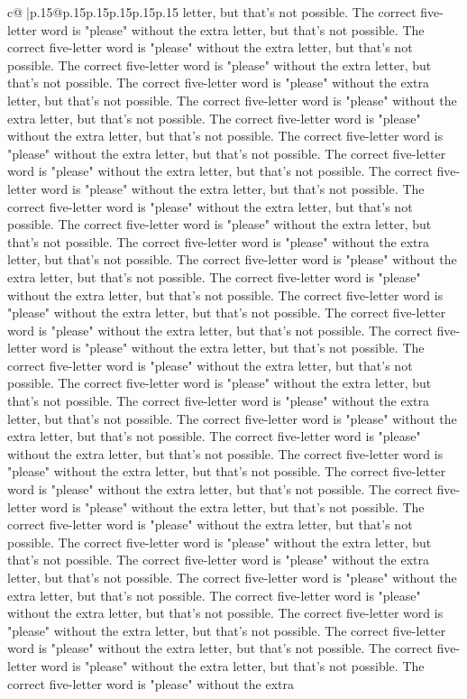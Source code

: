 \documentclass{article}
\begin{document}
{\begin{supertabular}{c@{$\;$}|p{.15\linewidth}@{}p{.15\linewidth}p{.15\linewidth}p{.15\linewidth}p{.15\linewidth}p{.15\linewidth}}
{{{letter, but that's not possible. The correct five{-}letter word is "please" without the extra letter, but that's not possible. The correct five{-}letter word is "please" without the extra letter, but that's not possible. The correct five{-}letter word is "please" without the extra letter, but that's not possible. The correct five{-}letter word is "please" without the extra letter, but that's not possible. The correct five{-}letter word is "please" without the extra letter, but that's not possible. The correct five{-}letter word is "please" without the extra letter, but that's not possible. The correct five{-}letter word is "please" without the extra letter, but that's not possible. The correct five{-}letter word is "please" without the extra letter, but that's not possible. The correct five{-}letter word is "please" without the extra letter, but that's not possible. The correct five{-}letter word is "please" without the extra letter, but that's not possible. The correct five{-}letter word is "please" without the extra letter, but that's not possible. The correct five{-}letter word is "please" without the extra letter, but that's not possible. The correct five{-}letter word is "please" without the extra letter, but that's not possible. The correct five{-}letter word is "please" without the extra letter, but that's not possible. The correct five{-}letter word is "please" without the extra letter, but that's not possible. The correct five{-}letter word is "please" without the extra letter, but that's not possible. The correct five{-}letter word is "please" without the extra letter, but that's not possible. The correct five{-}letter word is "please" without the extra letter, but that's not possible. The correct five{-}letter word is "please" without the extra letter, but that's not possible. The correct five{-}letter word is "please" without the extra letter, but that's not possible. The correct five{-}letter word is "please" without the extra letter, but that's not possible. The correct five{-}letter word is "please" without the extra letter, but that's not possible. The correct five{-}letter word is "please" without the extra letter, but that's not possible. The correct five{-}letter word is "please" without the extra letter, but that's not possible. The correct five{-}letter word is "please" without the extra letter, but that's not possible. The correct five{-}letter word is "please" without the extra letter, but that's not possible. The correct five{-}letter word is "please" without the extra letter, but that's not possible. The correct five{-}letter word is "please" without the extra letter, but that's not possible. The correct five{-}letter word is "please" without the extra letter, but that's not possible. The correct five{-}letter word is "please" without the extra letter, but that's not possible. The correct five{-}letter word is "please" without the extra letter, but that's not possible. The correct five{-}letter word is "please" without the extra letter, but that's not possible. The correct five{-}letter word is "please" without the extra letter, but that's not possible. The correct five{-}letter word is "please" without the extra }}}
\end{supertabular}}
\end{document}
